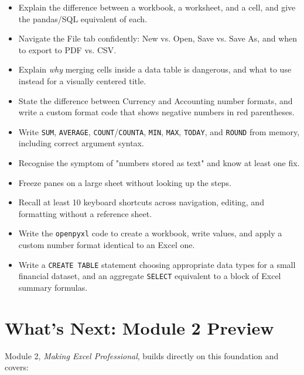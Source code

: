 \documentclass[11pt,a4paper]{article}
\begin{document}
\begin{itemize}
  \item[$\square$] Explain the difference between a workbook, a worksheet, and a cell, and give the pandas/SQL equivalent of each.
  \item[$\square$] Navigate the File tab confidently: New vs. Open, Save vs. Save As, and when to export to PDF vs. CSV.
  \item[$\square$] Explain \emph{why} merging cells inside a data table is dangerous, and what to use instead for a visually centered title.
  \item[$\square$] State the difference between Currency and Accounting number formats, and write a custom format code that shows negative numbers in red parentheses.
  \item[$\square$] Write \texttt{SUM}, \texttt{AVERAGE}, \texttt{COUNT}/\texttt{COUNTA}, \texttt{MIN}, \texttt{MAX}, \texttt{TODAY}, and \texttt{ROUND} from memory, including correct argument syntax.
  \item[$\square$] Recognise the symptom of "numbers stored as text" and know at least one fix.
  \item[$\square$] Freeze panes on a large sheet without looking up the steps.
  \item[$\square$] Recall at least 10 keyboard shortcuts across navigation, editing, and formatting without a reference sheet.
  \item[$\square$] Write the \texttt{openpyxl} code to create a workbook, write values, and apply a custom number format identical to an Excel one.
  \item[$\square$] Write a \texttt{CREATE TABLE} statement choosing appropriate data types for a small financial dataset, and an aggregate \texttt{SELECT} equivalent to a block of Excel summary formulas.
\end{itemize}

\section{What's Next: Module 2 Preview}

Module 2, \textit{Making Excel Professional}, builds directly on this foundation and covers:
\end{document}

